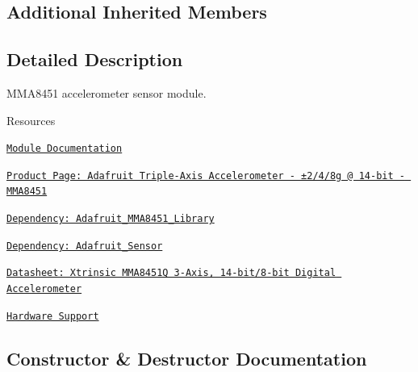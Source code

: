 \subsection*{Additional Inherited Members}


\subsection{Detailed Description}
M\+M\+A8451 accelerometer sensor module. 

\begin{DoxyParagraph}{Resources}

\begin{DoxyItemize}
\item \href{https://openslab-osu.github.io/Loom/html/class_loom___m_m_a8451.html}{\tt Module Documentation}
\item \href{https://www.adafruit.com/product/2019}{\tt Product Page\+: Adafruit Triple-\/\+Axis Accelerometer -\/ ±2/4/8g @ 14-\/bit -\/ M\+M\+A8451}
\item \href{https://github.com/adafruit/Adafruit_MMA8451_Library}{\tt Dependency\+: Adafruit\+\_\+\+M\+M\+A8451\+\_\+\+Library}
\item \href{https://github.com/adafruit/Adafruit_Sensor}{\tt Dependency\+: Adafruit\+\_\+\+Sensor}
\item \href{https://cdn-shop.adafruit.com/datasheets/MMA8451Q-1.pdf}{\tt Datasheet\+: Xtrinsic M\+M\+A8451Q 3-\/\+Axis, 14-\/bit/8-\/bit Digital Accelerometer}
\item \href{https://github.com/OPEnSLab-OSU/Loom/wiki/Hardware-Support#mma8451-triple-axis-accelerometer}{\tt Hardware Support} 
\end{DoxyItemize}
\end{DoxyParagraph}


\subsection{Constructor \& Destructor Documentation}
